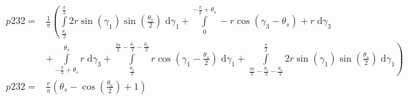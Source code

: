 \begin{align}
    p232 =&\frac{1}{\pi} \left(\int\limits_{\frac{\theta_{s}}{2}}^{\frac{\pi}{2}}2 r \sin{\left (\gamma_{1} \right )} \sin{\left (\frac{\theta_{s}}{2} \right )}\;\mathrm{d}\gamma_{1}+\int\limits_{0}^{- \frac{\pi}{2} + \theta_{s}}- r \cos{\left (\gamma_{3} - \theta_{s} \right )} + r\;\mathrm{d}\gamma_{3}\right.\\
 &\left.+\int\limits_{- \frac{\pi}{2} + \theta_{s}}^{\theta_{s}}r\;\mathrm{d}\gamma_{3}+\int\limits_{\frac{\theta_{s}}{2}}^{\frac{3 \pi}{2} - \frac{\theta_{s}}{2} - \frac{\theta_{a}}{2}}r \cos{\left (\gamma_{1} - \frac{\theta_{s}}{2} \right )}\;\mathrm{d}\gamma_{1}+\int\limits_{\frac{3 \pi}{2} - \frac{\theta_{s}}{2} - \frac{\theta_{a}}{2}}^{\frac{\pi}{2}}2 r \sin{\left (\gamma_{1} \right )} \sin{\left (\frac{\theta_{s}}{2} \right )}\;\mathrm{d}\gamma_{1}\right)\\
    p232 =& \frac{r}{\pi} \left(\theta_{s} - \cos{\left (\frac{\theta_{a}}{2} \right )} + 1\right)
\end{align}